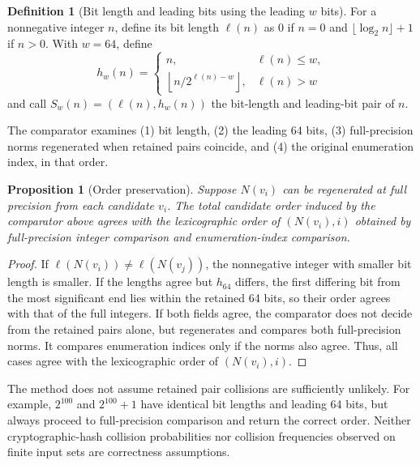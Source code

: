 \documentclass[a4paper,10pt]{article}
\newtheorem{proposition}{Proposition}
\theoremstyle{definition}
\newtheorem{definition}{Definition}
\theoremstyle{remark}
\begin{document}
\begin{definition}[Bit length and leading bits using the leading $w$ bits]
For a nonnegative integer $n$, define its bit length $\ell(n)$ as 0 if $n=0$ and $\lfloor\log_2 n\rfloor+1$ if $n>0$. With $w=64$, define
\begin{equation}
  h_w(n)=
  \begin{cases}
    n, & \ell(n)\leq w,\\
    \left\lfloor n/2^{\ell(n)-w}\right\rfloor, & \ell(n)>w
  \end{cases}
\end{equation}
and call $S_w(n)=(\ell(n),h_w(n))$ the bit-length and leading-bit pair of $n$.
\end{definition}

The comparator examines (1) bit length, (2) the leading 64 bits, (3) full-precision norms regenerated when retained pairs coincide, and (4) the original enumeration index, in that order.

\begin{proposition}[Order preservation]
\label{prop:order-preservation}
Suppose $N(v_i)$ can be regenerated at full precision from each candidate $v_i$. The total candidate order induced by the comparator above agrees with the lexicographic order of $(N(v_i),i)$ obtained by full-precision integer comparison and enumeration-index comparison.
\end{proposition}

\begin{proof}
If $\ell(N(v_i))\neq\ell(N(v_j))$, the nonnegative integer with smaller bit length is smaller. If the lengths agree but $h_{64}$ differs, the first differing bit from the most significant end lies within the retained 64 bits, so their order agrees with that of the full integers. If both fields agree, the comparator does not decide from the retained pairs alone, but regenerates and compares both full-precision norms. It compares enumeration indices only if the norms also agree. Thus, all cases agree with the lexicographic order of $(N(v_i),i)$.
\end{proof}

The method does not assume retained pair collisions are sufficiently unlikely. For example, $2^{100}$ and $2^{100}+1$ have identical bit lengths and leading 64 bits, but always proceed to full-precision comparison and return the correct order. Neither cryptographic-hash collision probabilities nor collision frequencies observed on finite input sets are correctness assumptions.
\end{document}

